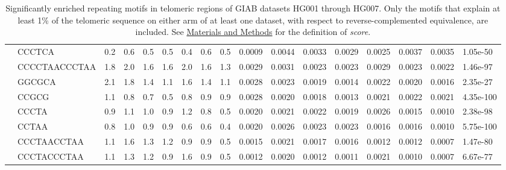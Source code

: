 \begin{landscape}
\begin{samepage}
\begin{table}[h!]
\begin{tabular}{lllllllllllllllll}
\textbf{}    &         CCCTCA &  0.2  &  0.6  &  0.5  &  0.5  &  0.4  &  0.6  &  0.5  &  0.0009 &  0.0044 &  0.0033 &  0.0029 &  0.0025 &  0.0037 &  0.0035 &   1.05e-50 \\
\textbf{}    &  CCCCTAACCCTAA &  1.8  &  2.0  &  1.6  &  1.6  &  2.0  &  1.6  &  1.3  &  0.0029 &  0.0031 &  0.0023 &  0.0023 &  0.0029 &  0.0023 &  0.0022 &   1.46e-97 \\
\textbf{}    &         GGCGCA &  2.1  &  1.8  &  1.4  &  1.1  &  1.6  &  1.4  &  1.1  &  0.0028 &  0.0023 &  0.0019 &  0.0014 &  0.0022 &  0.0020 &  0.0016 &   2.35e-27 \\
\textbf{}    &          CCGCG &  1.1  &  0.8  &  0.7  &  0.5  &  0.8  &  0.9  &  0.9  &  0.0028 &  0.0020 &  0.0018 &  0.0013 &  0.0021 &  0.0022 &  0.0021 &  4.35e-100 \\
\textbf{}    &          CCCTA &  0.9  &  1.1  &  1.0  &  0.9  &  1.2  &  0.8  &  0.5  &  0.0020 &  0.0021 &  0.0022 &  0.0019 &  0.0026 &  0.0015 &  0.0010 &   2.38e-98 \\
\textbf{}    &          CCTAA &  0.8  &  1.0  &  0.9  &  0.9  &  0.6  &  0.6  &  0.4  &  0.0020 &  0.0026 &  0.0023 &  0.0023 &  0.0016 &  0.0016 &  0.0010 &  5.75e-100 \\
\textbf{}    &    CCCTAACCTAA &  1.1  &  1.6  &  1.3  &  1.2  &  0.9  &  0.9  &  0.5  &  0.0015 &  0.0021 &  0.0017 &  0.0016 &  0.0012 &  0.0012 &  0.0007 &   1.47e-80 \\
\textbf{}    &    CCCTACCCTAA &  1.1  &  1.3  &  1.2  &  0.9  &  1.6  &  0.9  &  0.5  &  0.0012 &  0.0020 &  0.0012 &  0.0011 &  0.0021 &  0.0010 &  0.0007 &   6.67e-77 \\
\hline
\end{tabular}
\caption{
    \small Significantly enriched repeating motifs in telomeric regions of GIAB datasets HG001 through HG007.
    Only the motifs that explain at least 1\% of the telomeric sequence on either arm of at least one dataset,
    with respect to reverse-complemented equivalence, are included.
    See \hyperref[sec:methods]{Materials and Methods} for the definition of \textit{score}.
}
\label{tab:repeatfinder}
\end{table}
\end{samepage}
\end{landscape}
